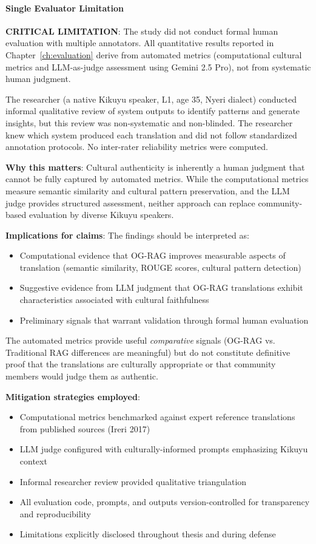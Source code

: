\paragraph{Single Evaluator Limitation}

\textbf{CRITICAL LIMITATION}: The study did not conduct formal human evaluation with multiple annotators. All quantitative results reported in Chapter~\ref{ch:evaluation} derive from automated metrics (computational cultural metrics and LLM-as-judge assessment using Gemini 2.5 Pro), not from systematic human judgment.

The researcher (a native Kikuyu speaker, L1, age 35, Nyeri dialect) conducted informal qualitative review of system outputs to identify patterns and generate insights, but this review was non-systematic and non-blinded. The researcher knew which system produced each translation and did not follow standardized annotation protocols. No inter-rater reliability metrics were computed.

\textbf{Why this matters}: Cultural authenticity is inherently a human judgment that cannot be fully captured by automated metrics. While the computational metrics measure semantic similarity and cultural pattern preservation, and the LLM judge provides structured assessment, neither approach can replace community-based evaluation by diverse Kikuyu speakers.

\textbf{Implications for claims}: The findings should be interpreted as:
\begin{itemize}
    \item Computational evidence that OG-RAG improves measurable aspects of translation (semantic similarity, ROUGE scores, cultural pattern detection)
    \item Suggestive evidence from LLM judgment that OG-RAG translations exhibit characteristics associated with cultural faithfulness
    \item Preliminary signals that warrant validation through formal human evaluation
\end{itemize}

The automated metrics provide useful \emph{comparative} signals (OG-RAG vs. Traditional RAG differences are meaningful) but do not constitute definitive proof that the translations are culturally appropriate or that community members would judge them as authentic.

\textbf{Mitigation strategies employed}:
\begin{itemize}
    \item Computational metrics benchmarked against expert reference translations from published sources (Ireri 2017)
    \item LLM judge configured with culturally-informed prompts emphasizing Kikuyu context
    \item Informal researcher review provided qualitative triangulation
    \item All evaluation code, prompts, and outputs version-controlled for transparency and reproducibility
    \item Limitations explicitly disclosed throughout thesis and during defense
\end{itemize}

